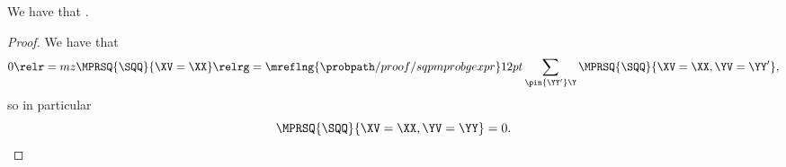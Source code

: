 \begin{proposition}
  We have that \sqpmargzimplprop.%
\end{proposition}

\begin{proof}
  We have that
  $$0 \relr = mz \MPRSQ{\SQQ}{\XV = \XX} \relrg = {\mreflng{\probpath/proof/sqpmprobgexpr}} 12pt \sum_{\pin{\YY'}\Y} \MPRSQ{\SQQ}{\XV = \XX, \YV = \YY'},$$%
  so in particular 
  $$\MPRSQ{\SQQ}{\XV = \XX, \YV = \YY} = 0.$$%
\end{proof}
